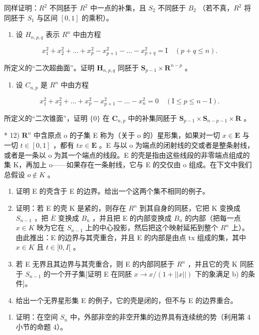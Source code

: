 同样证明：\(R^{2}\) 不同胚于 \(R^{2}\) 中一点的补集，且 \(S_{2}\) 不同胚于 \(B_{2}\) （若不真，\(R^{2}\) 将同胚于 \(S_{1}\) 与区间 \([0, 1]\) 的乘积）。

\begin{enumerate}
\def\labelenumi{\arabic{enumi})}
\setcounter{enumi}{9}
\tightlist
\item
  设 \(H_{n,p,q}\) 表示 \(R^{n}\) 中由方程
\end{enumerate}

\[
x _ {1} ^ {2} + x _ {2} ^ {2} + \dots + x _ {p} ^ {2} - x _ {p + 1} ^ {2} - \dots - x _ {p + q} ^ {2} = \mathrm{I} \quad (p + q \leqslant n).
\]

所定义的“二次超曲面”。证明 \(\mathbf{H}_{n,p,q}\) 同胚于 \(\mathbf{S}_{p - 1}\times \mathbf{R}^{n - p}\) 。

\begin{enumerate}
\def\labelenumi{\arabic{enumi})}
\setcounter{enumi}{10}
\tightlist
\item
  设 \(C_{n,p}\) 是 \(R^{n}\) 中由方程
\end{enumerate}

\[
x _ {1} ^ {2} + x _ {2} ^ {2} + \dots + x _ {p} ^ {2} - x _ {p + 1} ^ {2} - \dots - x _ {n} ^ {2} = 0 \quad (\mathrm{I} \leqslant p \leqslant n - \mathrm{I}).
\]

所定义的“二次锥面”，证明 \(\{0\}\) 在 \(\mathbf{C}_{n,p}\) 中的补集同胚于 \(\mathbf{S}_{p-1} \times \mathbf{S}_{n-p-1} \times \mathbf{R}\) 。

* 12) \(\mathbf{R}^n\) 中含原点 o 的子集 E 称为（关于 o 的）星形集，如果对一切 \(x \in \mathbf{E}\) 与一切 \(t \in [0, 1]\) ，都有 \(tx \in \mathbf{E}\) 。E 与以 o 为端点的闭射线的交或者是整条射线，或者是一条以 o 为其一个端点的线段。E 的壳是指由这些线段的非零端点组成的集 K，再加上 o——如果存在一条射线，它与 E 的交仅由 o 组成。在下文中我们总假设 \(o \notin K\) 。

\begin{enumerate}
\def\labelenumi{\alph{enumi})}
\item
  证明 E 的壳含于 E 的边界。给出一个这两个集不相同的例子。
\item
  证明：若 E 的壳 K 是紧的，则存在 \(R^{n}\) 到其自身的同胚，它把 K 变换成 \(S_{n-1}\) ，把 \(\overline{E}\) 变换成 \(B_{n}\) ，并且把 E 的内部变换成 \(B_{n}\) 的内部（把每一点 \(x \in K\) 映为它在 \(S_{n-1}\) 上的中心投影，然后把这个映射延拓到整个 \(R^{n}\) 上）。由此推出：E 的边界与其壳重合，并且 E 的内部是由点 tx 组成的集，其中 \(x \in K\) 且 \(t \in [0, I[\) 。
\item
  若 E 无界且其边界与其壳重合，则 E 的内部同胚于 \(R^{n}\) ，并且它的壳 K 同胚于 \(S_{n-1}\) 的一个开子集{[}证明 E 在同胚 \(x \to x/(1 + ||x||)\) 下的象满足 b) 的条件{]}。
\item
  给出一个无界星形集 E 的例子，它的壳是闭的，但不与 E 的边界重合。
\end{enumerate}

\begin{enumerate}
\def\labelenumi{\arabic{enumi})}
\setcounter{enumi}{12}
\tightlist
\item
  证明：在空间 \(S_{n}\) 中，外部非空的非空开集的边界具有连续统的势（利用第 4 小节的命题 4）。
\end{enumerate}

